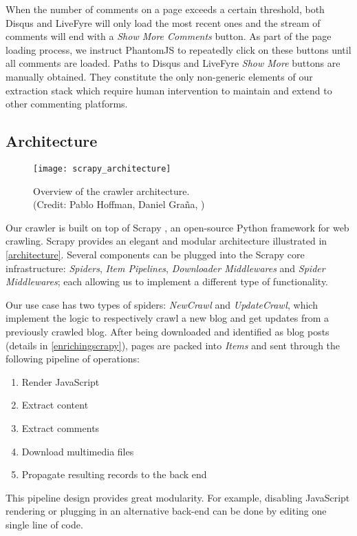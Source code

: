 When the number of comments on a page exceeds a certain threshold, both Disqus and LiveFyre will only load the most recent ones and the stream of comments will end with a \emph{Show More Comments} button. As part of the page loading process, we instruct PhantomJS to repeatedly click on these buttons until all comments are loaded. Paths to Disqus and LiveFyre \emph{Show More} buttons are manually obtained. They constitute the only non-generic elements of our extraction stack which require human intervention to maintain and extend to other commenting platforms.


\subsection{Architecture}

\begin{figure}
  \capstart
  \centering
  \texttt{[image: scrapy\_architecture]}
  \caption{Overview of the crawler architecture.\\(Credit: Pablo Hoffman, Daniel Graña, \cite{scrapy2013})}
  \label{architecture}
\end{figure}

Our crawler is built on top of Scrapy \cite{scrapy2013}, an open-source Python framework for web crawling. Scrapy provides an elegant and modular architecture illustrated in \autoref{architecture}. Several components can be plugged into the Scrapy core infrastructure: \emph{Spiders}, \emph{Item Pipelines}, \emph{Downloader Middlewares} and \emph{Spider Middlewares}; each allowing us to implement a different type of functionality.

Our use case has two types of spiders: \emph{NewCrawl} and \emph{UpdateCrawl}, which implement the logic to respectively crawl a new blog and get updates from a previously crawled blog. After being downloaded and identified as blog posts (details in \autoref{enrichingscrapy}), pages are packed into \emph{Items} and sent through the following pipeline of operations:
\begin{enumerate}
  \item Render JavaScript
  \item Extract content
  \item Extract comments
  \item Download multimedia files
  \item Propagate resulting records to the back end
\end{enumerate}
This pipeline design provides great modularity. For example, disabling JavaScript rendering or plugging in an alternative back-end can be done by editing one single line of code.


